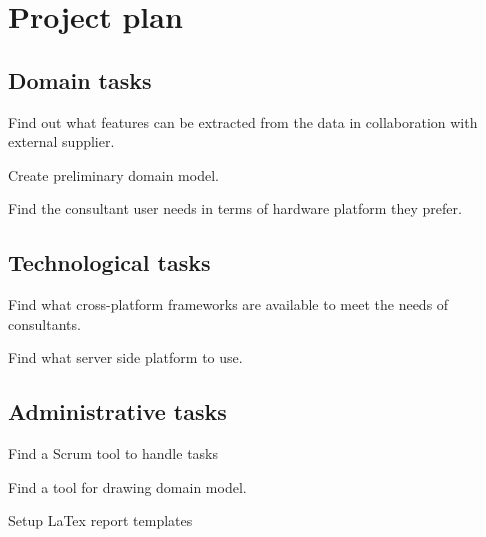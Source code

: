 \chapter{Project plan}

\section*{Domain tasks}
Find out what features can be extracted from the data in collaboration with external supplier.

Create preliminary domain model.

Find the consultant user needs in terms of hardware platform they prefer.

\section*{Technological tasks}

Find what cross-platform frameworks are available to meet the needs of consultants.

Find what server side platform to use.


\section*{Administrative tasks}

Find a Scrum tool to handle tasks

Find a tool for drawing domain model.

Setup LaTex report templates

